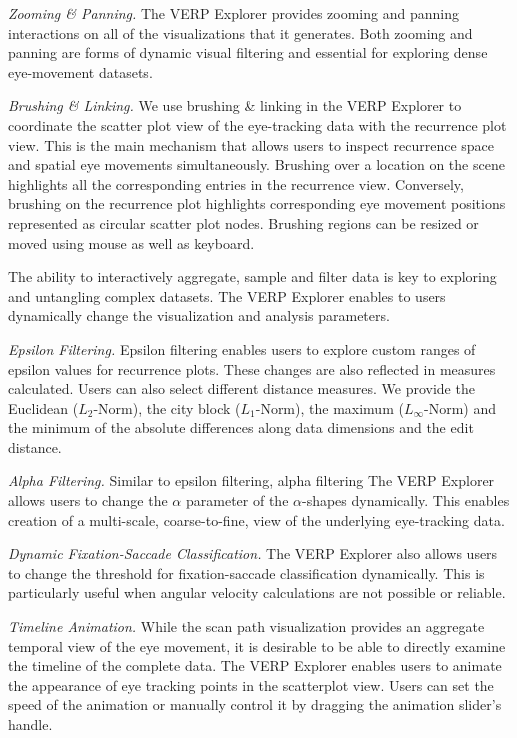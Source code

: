 \documentclass[journal]{vgtc}                %
\begin{document}
\emph{Zooming \& Panning.} The VERP Explorer provides zooming and panning
interactions on all of the visualizations that it generates. Both zooming
and panning are forms of dynamic visual filtering and essential for
exploring dense eye-movement datasets. 

\emph{Brushing \& Linking.} We use brushing \& linking in the VERP Explorer
to coordinate the scatter plot view of the eye-tracking data with the
recurrence plot view. This is the main mechanism that allows users to
inspect recurrence space and spatial eye movements simultaneously. Brushing
over a location on the scene highlights all the corresponding entries in
the recurrence view.  Conversely, brushing on the recurrence plot
highlights corresponding eye movement positions represented as circular
scatter plot nodes.  Brushing regions  can be resized or moved  using mouse
as well as keyboard.

The ability to interactively aggregate, sample
and filter data is key to exploring and untangling complex datasets. The
VERP Explorer enables to users dynamically change the visualization and
analysis parameters. 

\emph{Epsilon Filtering.} Epsilon filtering enables users to explore custom
ranges of epsilon values  for recurrence plots. These changes are also
reflected in measures calculated.  Users can also select different distance
measures. We provide the Euclidean ($L_{2}$-Norm), the city block ($L_{1}$-Norm), 
the maximum ($L_{\infty}$-Norm) and the minimum of the absolute
differences along data dimensions and the edit distance.  

\emph{Alpha Filtering.} Similar to epsilon filtering, alpha 
filtering The VERP Explorer allows users to change the $\alpha$ parameter of the 
$\alpha$-shapes dynamically. This enables creation of  a multi-scale, coarse-to-fine,
view of the underlying  eye-tracking data. 

\emph{Dynamic Fixation-Saccade Classification.} The VERP Explorer also
allows users to change the threshold for fixation-saccade classification
dynamically. This is particularly useful when angular velocity calculations
are not possible or reliable. 

\emph{Timeline Animation.} While the scan path visualization provides an
aggregate temporal  view of the  eye movement, it is desirable to be able
to directly examine the timeline of the complete data.  The VERP Explorer
enables users to animate the appearance of eye tracking points in the
scatterplot view. Users can set the speed of the animation or manually
control it by dragging the animation slider’s handle. 
\end{document}
